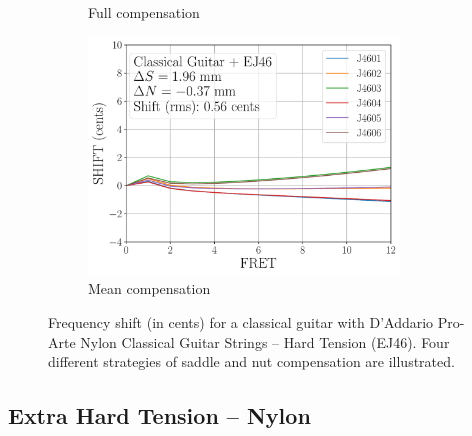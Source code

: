 \begin{figure}
\begin{subfigure}[b]{0.45\textwidth}
   \caption{Full compensation}
   \label{fig:shift_classicalguitar_ej46_full}
  \end{subfigure}
  \hspace{0.25in}
  \begin{subfigure}[b]{0.45\textwidth}
   \centering
   \includegraphics[width=3.25in]{figures/shift_classicalguitar_ej46_mean}
   \caption{Mean compensation}
   \label{fig:shift_classicalguitar_ej46_mean}
  \end{subfigure}
  \caption{\label{fig:compensation_classicalguitar_ej46} Frequency shift (in cents) for a classical guitar with D'Addario Pro-Arte Nylon Classical Guitar Strings -- Hard Tension (EJ46). Four different strategies of saddle and nut compensation are illustrated.}
 \end{figure}

 \newpage
 \subsection{Extra Hard Tension -- Nylon}


